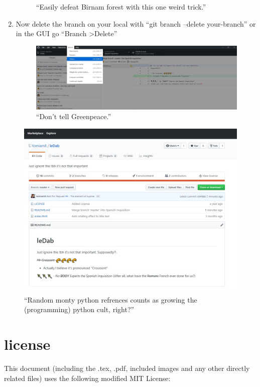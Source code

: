 \documentclass[11pt, titlepage]{article}
\begin{document}
\begin{enumerate}
\begin{figure}[H]
		\caption{``Easily defeat Birnam forest with this one weird trick.''}
	\end{figure}
	\item Now delete the branch on your local with ``git branch --delete your-branch'' or in the GUI go ``Branch \textgreater Delete''
	\begin{figure}[H]
		\centering
		\includegraphics[width=\textwidth]{BPRW/12Delete-branch-github-desktop}
		\caption{``Don't tell Greenpeace.''}
	\end{figure}
\end{enumerate}
\begin{figure}[H]
	\centering
	\includegraphics[width=\textwidth]{BPRW/13end-result}
	\caption{``Random monty python refrences counts as growing the (programming) python cult, right?''}
\end{figure}
	
\section{license}
This document (including the .tex, .pdf, included images and any other directly related files) uses the following modified MIT License:
\end{document}
